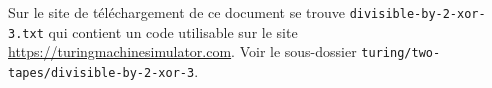 Sur le site de téléchargement de ce document se trouve \verb+divisible-by-2-xor-3.txt+ qui contient un code utilisable sur le site \url{https://turingmachinesimulator.com}. Voir le sous-dossier \verb+turing/two-tapes/divisible-by-2-xor-3+.